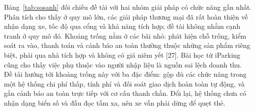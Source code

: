 Bảng~\ref{tab:sosanh} đối chiếu đề tài với hai nhóm giải pháp có chức năng gần nhất. Phân
tích cho thấy ở quy mô lớn, các giải pháp thương mại đã rất hoàn thiện về nhận dạng xe, tốc
độ qua cổng và khả năng tích hợp; đề tài không nhằm cạnh tranh ở quy mô đó. Khoảng trống
nằm ở các bãi nhỏ: phát hiện chỗ trống, kiểm soát ra vào, thanh toán và cảnh báo an toàn thường
thuộc những sản phẩm riêng biệt, phải qua nhà tích hợp và không có giá niêm yết [27]. Bài
học từ iParking cũng cho thấy việc phụ thuộc vào người nhập liệu là nguồn sai lệch doanh thu.
Đề tài hướng tới khoảng trống này với ba đặc điểm: gộp đủ các chức năng trong một hệ thống
chi phí thấp, tính phí và đối soát giao dịch hoàn toàn tự động, và gắn cảnh báo an toàn
trực tiếp với cơ cấu thanh chắn. Đổi lại, hệ thống chưa có nhận dạng biển số và đầu đọc tầm
xa, nên xe vẫn phải dừng để quẹt thẻ.
